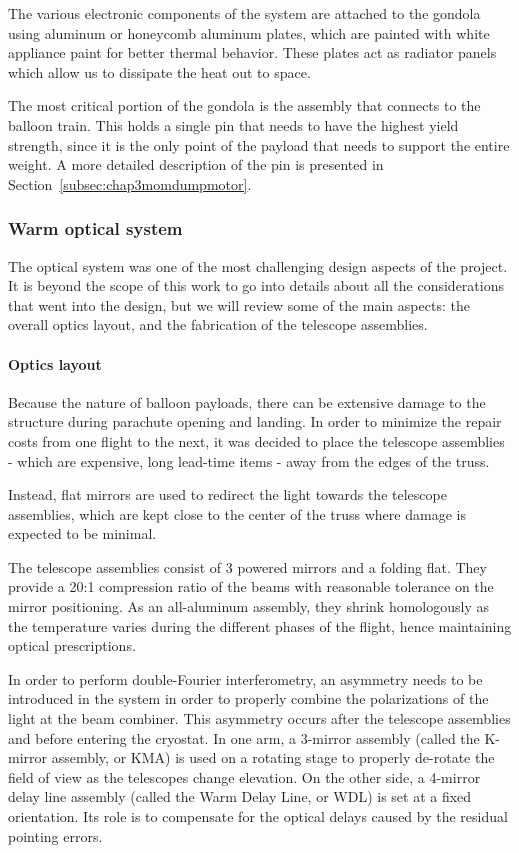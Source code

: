 The various electronic components of the system are attached to the gondola using aluminum or honeycomb aluminum plates, which are painted with white appliance paint for better thermal behavior. These plates act as radiator panels which allow us to dissipate the heat out to space.

The most critical portion of the gondola is the assembly that connects to the balloon train. This holds a single pin that needs to have the highest yield strength, since it is the only point of the payload that needs to support the entire weight. A more detailed description of the pin is presented in Section~\ref{subsec:chap3momdumpmotor}.



\subsubsection{Warm optical system}

The optical system was one of the most challenging design aspects of the project. It is beyond the scope of this work to go into details about all the considerations that went into the design, but we will review some of the main aspects: the overall optics layout, and the fabrication of the telescope assemblies.

\paragraph{Optics layout}
Because the nature of balloon payloads, there can be extensive damage to the structure during parachute opening and landing. In order to minimize the repair costs from one flight to the next, it was decided to place the telescope assemblies - which are expensive, long lead-time items - away from the edges of the truss. 

Instead, flat mirrors are used to redirect the light towards the telescope assemblies, which are kept close to the center of the truss where damage is expected to be minimal. 

The telescope assemblies consist of 3 powered mirrors and a folding flat. They provide a 20:1 compression ratio of the beams with reasonable tolerance on the mirror positioning. As an all-aluminum assembly, they shrink homologously as the temperature varies during the different phases of the flight, hence maintaining optical prescriptions. 

In order to perform double-Fourier interferometry, an asymmetry needs to be introduced in the system in order to properly combine the polarizations of the light at the beam combiner. This asymmetry occurs after the telescope assemblies and before entering the cryostat. In one arm, a 3-mirror assembly (called the K-mirror assembly, or KMA) is used on a rotating stage to properly de-rotate the field of view as the telescopes change elevation. On the other side, a 4-mirror delay line assembly (called the Warm Delay Line, or WDL) is set at a fixed orientation. Its role is to compensate for the optical delays caused by the residual pointing errors. 

